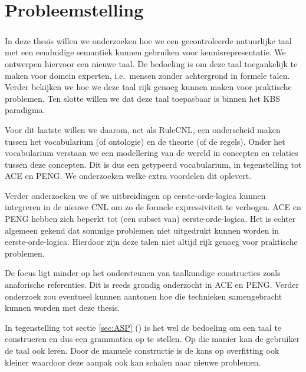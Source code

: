 \chapter{Probleemstelling}
\paragraph{} In deze thesis willen we onderzoeken hoe we een gecontroleerde natuurlijke taal met een eenduidige semantiek kunnen gebruiken voor kennisrepresentatie. We ontwerpen hiervoor een nieuwe taal. De bedoeling is om deze taal toegankelijk te maken voor domein experten, i.e.\ mensen zonder achtergrond in formele talen. Verder bekijken we hoe we deze taal rijk genoeg kunnen maken voor praktische problemen. Ten slotte willen we dat deze taal toepasbaar is binnen het KBS paradigma.

Voor dit laatste willen we daarom, net als RuleCNL, een onderscheid maken tussen het vocabularium (of ontologie) en de theorie (of de regels). Onder het vocabularium verstaan we een modellering van de wereld in concepten en relaties tussen deze concepten. Dit is dus een getypeerd vocabularium, in tegenstelling tot ACE en PENG. We onderzoeken welke extra voordelen dit oplevert. 

Verder onderzoeken we of we uitbreidingen op eerste-orde-logica kunnen integreren in de nieuwe CNL om zo de formele expressiviteit te verhogen. ACE en PENG hebben zich beperkt tot (een subset van) eerste-orde-logica. Het is echter algemeen gekend dat sommige problemen niet uitgedrukt kunnen worden in eerste-orde-logica. Hierdoor zijn deze talen niet altijd rijk genoeg voor praktische problemen.

De focus ligt minder op het ondersteunen van taalkundige constructies zoals anaforische referenties. Dit is reeds grondig onderzocht in ACE en PENG. Verder onderzoek zou eventueel kunnen aantonen hoe die technieken samengebracht kunnen worden met deze thesis.

In tegenstelling tot sectie \ref{sec:ASP} () is het wel de bedoeling om een taal te construeren en dus een grammatica op te stellen. Op die manier kan de gebruiker de taal ook leren. Door de manuele constructie is de kans op overfitting ook kleiner waardoor deze aanpak ook kan schalen naar nieuwe problemen.

